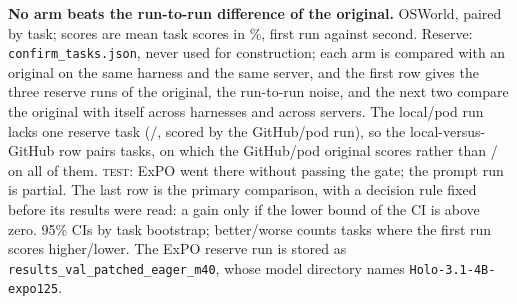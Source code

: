 \begin{table}[t]
\centering\small
\resizebox{\linewidth}{!}{}
\caption{\textbf{No arm beats the run-to-run difference of the original.} OSWorld, paired by task; scores are mean task scores in \%, first run against second. Reserve: \texttt{confirm\_tasks.json}, never used for construction; each arm is compared with an original on the same harness and the same server, and the first row gives the three reserve runs of the original, the run-to-run noise, and the next two compare the original with itself across harnesses and across servers. The local/pod run lacks one reserve task (\texttt{\onNoiseMissingDomain}/\texttt{\onNoiseMissingTask}, scored \onNoiseMissingScore{} by the GitHub/pod run), so the local-versus-GitHub row pairs \onNoiseN{} tasks, on which the GitHub/pod original scores \onNoiseOrig{} rather than \onReserveGhOrigScore/\onReserveGhOrigN{} on all of them. \textsc{test}: ExPO went there without passing the gate; the prompt run is partial. The last row is the primary comparison, with a decision rule fixed before its results were read: a gain only if the lower bound of the CI is above zero. 95\% CIs by task bootstrap; better/worse counts tasks where the first run scores higher/lower. The ExPO reserve run is stored as \texttt{results\_val\_patched\_eager\_m40}, whose model directory names \texttt{Holo-3.1-4B-expo125}.}
\label{tab:b4-heldout}
\end{table}
